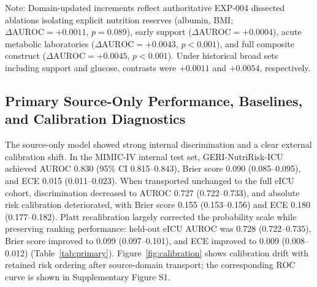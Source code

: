 \documentclass[utf8]{FrontiersinVancouver}
\newcommand{\re}[1]{#1}
\begin{document}
\begin{table}[htbp]
\centering
\caption{Source-only nutrition-construct sensitivity analysis for GERI-NutriRisk-ICU in eICU-CRD. Bold values indicate the best value among model rows; lower Brier score and ECE are better.}
\label{tab:nutrition_increment}
{\footnotesize \re{Note: Domain-updated increments reflect authoritative EXP-004 dissected ablations isolating explicit nutrition reserves (albumin, BMI; $\Delta\mathrm{AUROC}=+0.0011$, $p=0.089$), early support ($\Delta\mathrm{AUROC}=+0.0004$), acute metabolic laboratories ($\Delta\mathrm{AUROC}=+0.0043$, $p<0.001$), and full composite construct ($\Delta\mathrm{AUROC}=+0.0045$, $p<0.001$). Under historical broad sets including support and glucose, contrasts were $+0.0011$ and $+0.0054$, respectively.}}
\end{table}

\subsection{Primary Source-Only Performance, Baselines, and Calibration Diagnostics}
The source-only model showed strong internal discrimination and a clear external calibration shift. In the MIMIC-IV internal test set, GERI-NutriRisk-ICU achieved AUROC 0.830 (95\% CI 0.815--0.843), Brier score 0.090 (0.085--0.095), and ECE 0.015 (0.011--0.023). When transported unchanged to the full eICU cohort, discrimination decreased to AUROC 0.727 (0.722--0.733), and absolute risk calibration deteriorated, with Brier score 0.155 (0.153--0.156) and ECE 0.180 (0.177--0.182). Platt recalibration largely corrected the probability scale while preserving ranking performance: held-out eICU AUROC was 0.728 (0.722--0.735), Brier score improved to 0.099 (0.097--0.101), and ECE improved to 0.009 (0.008--0.012) (Table~\ref{tab:primary}). Figure~\ref{fig:calibration} shows calibration drift with retained risk ordering after source-domain transport; the corresponding ROC curve is shown in Supplementary Figure S1.
\end{document}
